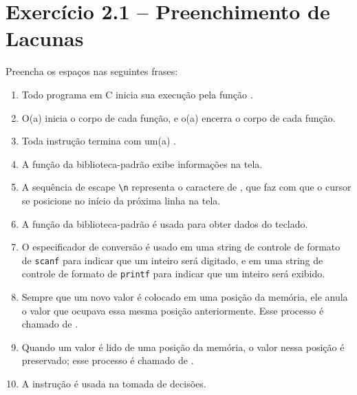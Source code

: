 \documentclass[12pt,a4paper]{article}
\begin{document}
\section{Exercício 2.1 -- Preenchimento de Lacunas}

\begin{enunciadoBox}[Enunciado]
Preencha os espaços nas seguintes frases:
\begin{enumerate}
  \item Todo programa em C inicia sua execução pela função \underline{\hspace{3cm}}.
  \item O(a) \underline{\hspace{2cm}} inicia o corpo de cada função, e o(a) \underline{\hspace{2cm}} encerra o corpo de cada função.
  \item Toda instrução termina com um(a) \underline{\hspace{3cm}}.
  \item A função \underline{\hspace{2cm}} da biblioteca-padrão exibe informações na tela.
  \item A sequência de escape \texttt{\textbackslash n} representa o caractere de \underline{\hspace{2cm}}, que faz com que o cursor se posicione no início da próxima linha na tela.
  \item A função \underline{\hspace{2cm}} da biblioteca-padrão é usada para obter dados do teclado.
  \item O especificador de conversão \underline{\hspace{2cm}} é usado em uma string de controle de formato de \texttt{scanf} para indicar que um inteiro será digitado, e em uma string de controle de formato de \texttt{printf} para indicar que um inteiro será exibido.
  \item Sempre que um novo valor é colocado em uma posição da memória, ele anula o valor que ocupava essa mesma posição anteriormente. Esse processo é chamado de \underline{\hspace{3cm}}.
  \item Quando um valor é lido de uma posição da memória, o valor nessa posição é preservado; esse processo é chamado de \underline{\hspace{3cm}}.
  \item A instrução \underline{\hspace{2cm}} é usada na tomada de decisões.
\end{enumerate}
\end{enunciadoBox}
\end{document}
